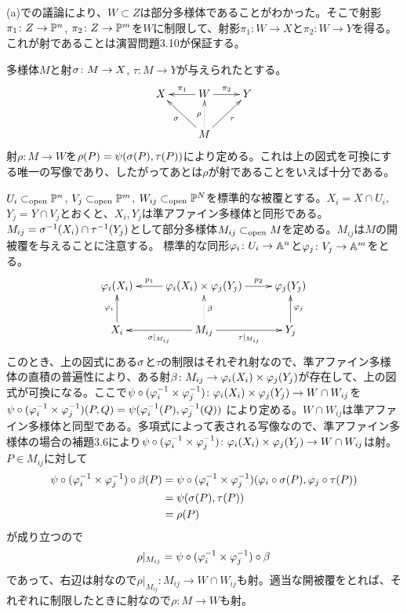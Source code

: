 \begin{description}
    (a)での議論により、$W \subset Z$は部分多様体であることがわかった。そこで射影$\pi_1 \colon Z \to \P^n$, $\pi_2 \colon Z \to \P^m$を$W$に制限して、射影$\pi_1 \colon W \to X$と$\pi_2 \colon W \to Y$を得る。これが射であることは演習問題3.10が保証する。

    多様体$M$と射$\grs \colon M \to X$, $\tau \colon M \to Y$が与えられたとする。
    \[
    \xymatrix{
    X & W \ar[l]_-{\pi_1} \ar[r]^-{\pi_2} & Y \\
    {} & M \ar[lu]^-{\grs} \ar[ru]_-{\tau}  \ar@{.>}[u]^{\rho} & {}
    }
    \]
    射$\rho \colon M \to W$を$\rho(P)=\psi(\grs(P), \tau(P))$により定める。これは上の図式を可換にする唯一の写像であり、したがってあとは$\rho$が射であることをいえば十分である。

    $U_i \opsub \P^n$, $V_j\opsub \P^m$, $W_{ij} \opsub \P^N$を標準的な被覆とする。$X_i = X \cap U_i$, $Y_j = Y \cap V_j$とおくと、$X_i, Y_j$は準アファイン多様体と同形である。$M_{ij} = \grs^{-1}(X_i) \cap \tau^{-1}(Y_j) $として部分多様体$M_{ij} \opsub M$を定める。$M_{ij}$は$M$の開被覆を与えることに注意する。
    標準的な同形$\vp_i \colon U_i \to \A^n$と$\vp_j \colon V_j \to \A^m$をとる。
    \[
    \xymatrix{
    \vp_i(X_i) & \vp_i(X_i) \tm \vp_j(Y_j) \ar[l]_-{p_1} \ar[r]^-{p_2} & \vp_j(Y_j)   \\
    X_i \ar[u]^{\vp_i} & M_{ij} \ar[l]^-{\grs|_{M_{ij}}} \ar[r]_-{\tau|_{M_{ij}}} \ar@{.>}[u]_-{\beta} & Y_j \ar[u]_{\vp_j}
    }
    \]
    このとき、上の図式にある$\grs$と$\tau$の制限はそれぞれ射なので、準アファイン多様体の直積の普遍性により、ある射$\beta \colon M_{ij} \to \vp_i(X_i) \tm \vp_j(Y_j)$が存在して、上の図式が可換になる。ここで$\psi \circ (\vp_i^{-1} \tm \vp_j^{-1}) \colon \vp_i(X_i) \tm \vp_j(Y_j) \to W \cap W_{ij}$を$\psi \circ (\vp_i^{-1} \tm \vp_j^{-1})(P,Q) = \psi(\vp_i^{-1}(P), \vp_j^{-1}(Q))$
    により定める。$W \cap W_{ij}$は準アファイン多様体と同型である。多項式によって表される写像なので、準アファイン多様体の場合の補題3.6により$\psi \circ (\vp_i^{-1} \tm \vp_j^{-1}) \colon \vp_i(X_i) \tm \vp_j(Y_j) \to W \cap W_{ij}$は射。$P \in M_{ij}$に対して
    \begin{align*}
      \psi \circ (\vp_i^{-1} \tm \vp_j^{-1}) \circ \beta(P) &= \psi \circ (\vp_i^{-1} \tm \vp_j^{-1}) (\vp_i \circ \grs(P), \vp_j \circ \tau(P)) \\
      &= \psi(\grs(P), \tau(P)) \\
      &= \rho (P)
    \end{align*}
    が成り立つので
    \[
    \rho|_{M_{ij}} = \psi \circ (\vp_i^{-1} \tm \vp_j^{-1}) \circ \beta
    \]
    であって、右辺は射なので$\rho|_{M_{ij}} \colon M_{ij} \to W \cap W_{ij}$も射。適当な開被覆をとれば、それぞれに制限したときに射なので$\rho \colon M \to W$も射。
  \end{description}



